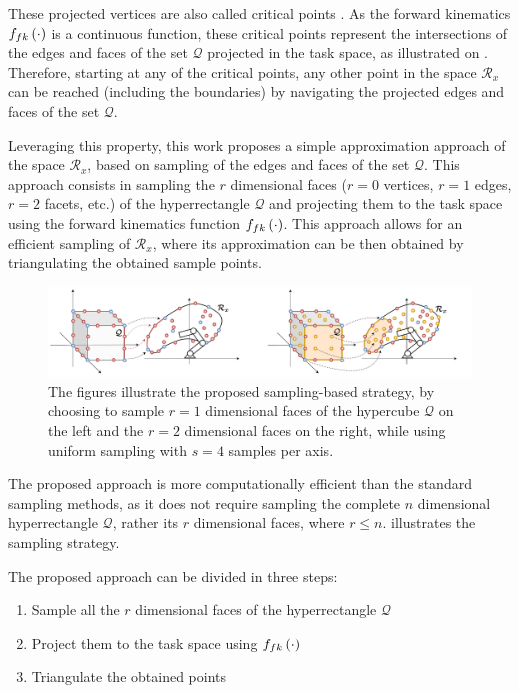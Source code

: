 These projected vertices are also called critical points \cite{MERLET1998critical}. As the forward kinematics $f_{fk}\left(\cdot\right)$ is a continuous function, these critical points represent the intersections of the edges and faces of the set $\mathcal{Q}$ projected in the task space, as illustrated on . Therefore, starting at any of the critical points, any other point in the space $\mathcal{R}_x$ can be reached (including the boundaries) by navigating the projected edges and faces of the set $\mathcal{Q}$. 


Leveraging this property, this work proposes a simple approximation approach of the space $\mathcal{R}_x$, based on sampling of the edges and faces of the set $\mathcal{Q}$.
This approach consists in sampling the $r$ dimensional faces ($r=0$ vertices, $r=1$ edges, $r=2$ facets, etc.) of the hyperrectangle $\mathcal{Q}$ and projecting them to the task space using the forward kinematics function $f_{fk}\left(\cdot\right)$. This approach allows for an efficient sampling of $\mathcal{R}_x$, where its approximation can be then obtained by triangulating the obtained sample points. 

\begin{figure}[!h]
    \centering
    \includegraphics[width=\textwidth]{Papers/images/curved_space_algo_new_faces.pdf}
    \caption{The figures illustrate the proposed sampling-based strategy, by choosing to sample $r=1$ dimensional faces of the hypercube $\mathcal{Q}$ on the left and the $r=2$ dimensional faces on the right, while using uniform sampling with $s=4$ samples per axis.}
    \label{fig:curved_space_algo_new_faces}
\end{figure}

The proposed approach is more computationally efficient than the standard sampling methods, as it does not require sampling the complete $n$ dimensional hyperrectangle $\mathcal{Q}$, rather its $r$ dimensional faces, where $r\leq n$.  illustrates the sampling strategy. 

The proposed approach can be divided in three steps:
\begin{enumerate}
    \item Sample all the $r$ dimensional faces of the hyperrectangle $\mathcal{Q}$
    \item Project them to the task space using $f_{fk}\left(\cdot\right)$
    \item Triangulate the obtained points
\end{enumerate}

